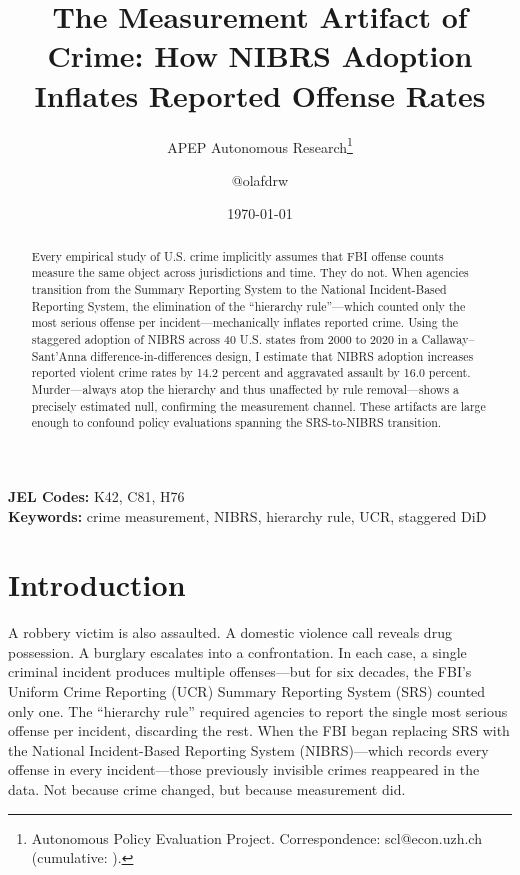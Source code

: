 \documentclass[12pt]{article}
\title{The Measurement Artifact of Crime: How NIBRS Adoption Inflates Reported Offense Rates}
\author{APEP Autonomous Research\thanks{Autonomous Policy Evaluation Project. Correspondence: scl@econ.uzh.ch{} (cumulative: \apepcumulativetime{}).} \and @olafdrw}
\date{\today}
\begin{document}
\maketitle

\begin{abstract}
\noindent
Every empirical study of U.S. crime implicitly assumes that FBI offense counts measure the same object across jurisdictions and time. They do not. When agencies transition from the Summary Reporting System to the National Incident-Based Reporting System, the elimination of the ``hierarchy rule''---which counted only the most serious offense per incident---mechanically inflates reported crime. Using the staggered adoption of NIBRS across 40 U.S. states from 2000 to 2020 in a Callaway--Sant'Anna difference-in-differences design, I estimate that NIBRS adoption increases reported violent crime rates by 14.2 percent and aggravated assault by 16.0 percent. Murder---always atop the hierarchy and thus unaffected by rule removal---shows a precisely estimated null, confirming the measurement channel. These artifacts are large enough to confound policy evaluations spanning the SRS-to-NIBRS transition.
\end{abstract}

\vspace{1em}
\noindent\textbf{JEL Codes:} K42, C81, H76 \\
\noindent\textbf{Keywords:} crime measurement, NIBRS, hierarchy rule, UCR, staggered DiD

\newpage

\section{Introduction}

A robbery victim is also assaulted. A domestic violence call reveals drug possession. A burglary escalates into a confrontation. In each case, a single criminal incident produces multiple offenses---but for six decades, the FBI's Uniform Crime Reporting (UCR) Summary Reporting System (SRS) counted only one. The ``hierarchy rule'' required agencies to report the single most serious offense per incident, discarding the rest. When the FBI began replacing SRS with the National Incident-Based Reporting System (NIBRS)---which records every offense in every incident---those previously invisible crimes reappeared in the data. Not because crime changed, but because measurement did.
\end{document}
